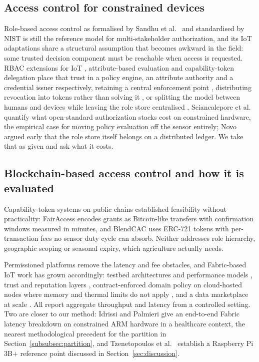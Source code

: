 \documentclass[a4paper,fleqn]{cas-dc}
\begin{document}
\subsection{Access control for constrained devices}
\label{subsec:rw_models}

Role-based access control as formalised by Sandhu et al.\ \cite{sandhu1996role}
and standardised by NIST \cite{ferraiolo2001role} is still the reference
model for multi-stakeholder authorization, and its IoT adaptations share a
structural assumption that becomes awkward in the field: some trusted
decision component must be reachable when access is requested. RBAC
extensions for IoT \cite{ye2015iot}, attribute-based evaluation
\cite{hu2014guide,servos2017abac,sciancalepore2017oauth} and capability-token
delegation \cite{hernandez2017capability} place that trust in a policy
engine, an attribute authority and a credential issuer respectively,
retaining a central enforcement point \cite{ye2015iot,servos2017abac},
distributing revocation into tokens rather than solving it
\cite{hernandez2017capability}, or splitting the model between humans and
devices while leaving the role store centralised
\cite{alshehri2016access}. Sciancalepore et
al.\ \cite{sciancalepore2017oauth} quantify what open-standard authorization
stacks cost on constrained hardware, the empirical case for moving policy
evaluation off the sensor entirely; Novo \cite{novo2018blockchain} argued
early that the role store itself belongs on a distributed ledger. We take
that as given and ask what it costs.

\subsection{Blockchain-based access control and how it is evaluated}
\label{subsec:rw_blockchain}

Capability-token systems on public chains established feasibility without
practicality: FairAccess \cite{ouaddah2016fairaccess} encodes grants as
Bitcoin-like transfers with confirmation windows measured in minutes, and
BlendCAC \cite{xu2018blendcac} uses ERC-721 tokens with per-transaction fees
no sensor duty cycle can absorb. Neither addresses role hierarchy,
geographic scoping or seasonal expiry, which agriculture actually needs.

Permissioned platforms remove the latency and fee obstacles, and Fabric-based
IoT work has grown accordingly: testbed architectures and performance models
\cite{shih2022iiot,pajooh2022fabric_iot,kepark2023fabric_model}, trust and
reputation layers \cite{putra2021trust}, contract-enforced domain policy on
cloud-hosted nodes where memory and thermal limits do not apply
\cite{usman2024blockchain}, and a data marketplace at scale
\cite{gonzalez2023marketplace}. All report aggregate throughput and latency
from a controlled setting. Two are closer to our method: Idrissi and
Palmieri \cite{idrissi2024blockchain_jsupercomput} give an end-to-end Fabric
latency breakdown on constrained ARM hardware in a healthcare context, the
nearest methodological precedent for the partition in
Section~\ref{subsubsec:partition}, and Tzenetopoulos et
al.\ \cite{tzenetopoulos2022hlfkubed} establish a Raspberry Pi 3B+ reference
point discussed in Section~\ref{sec:discussion}.
\end{document}
